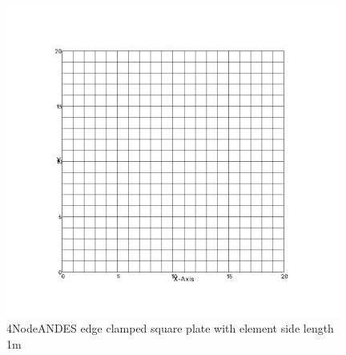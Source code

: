 \documentclass[fleqn,11pt,letter]{article}
\begin{document}
\begin{figure}[H]
  \centering
  \includegraphics[width=11cm]{../Figure_files/4NodeANDES/square_plate4.png}
  \caption{4NodeANDES edge clamped square plate with element side length 1m }
  \label{fig 4NodeANDES edges clamped square plate with element side length 1m }
\end{figure}






\end{document}
